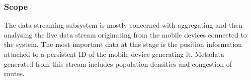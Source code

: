 \subsubsection{Scope}
The data streaming subsystem is mostly concerned with aggregating and then analysing the live data stream originating from the mobile devices connected to the system. The most important data at this stage is the position information attached to a persistent ID of the mobile device generating it. Metadata generated from this stream includes population densities and congestion of routes.

